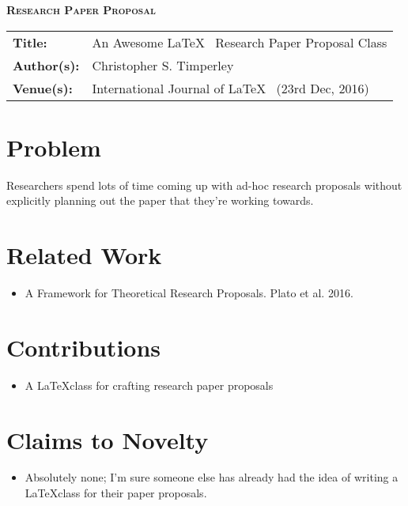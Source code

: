\documentclass{paper_proposal}
\begin{document}

\begin{center}
\textsc{\Large\textbf{Research Paper Proposal}}
\end{center}

\begin{framed}
\begin{tabular}{ll}
  \textbf{Title:} & An Awesome \LaTeX ~ Research Paper Proposal Class \\
  \textbf{Author(s):} & Christopher S. Timperley \\
  \textbf{Venue(s):} & International Journal of \LaTeX ~ (23rd Dec, 2016) \\
\end{tabular}
\end{framed}

\vspace{1mm}

\section{Problem}
Researchers spend lots of time coming up with ad-hoc research proposals
without explicitly planning out the paper that they're working towards.

\section{Related Work}
\begin{itemize}
  \item A Framework for Theoretical Research Proposals. Plato et al. 2016.
\end{itemize}

\section{Contributions}
\begin{itemize}
  \item A \LaTeX class for crafting research paper proposals
\end{itemize}

%
\section{Claims to Novelty}
\begin{itemize}
  \item Absolutely none; I'm sure someone else has already had the idea of
    writing a \LaTeX class for their paper proposals.
\end{itemize}
\end{document}
